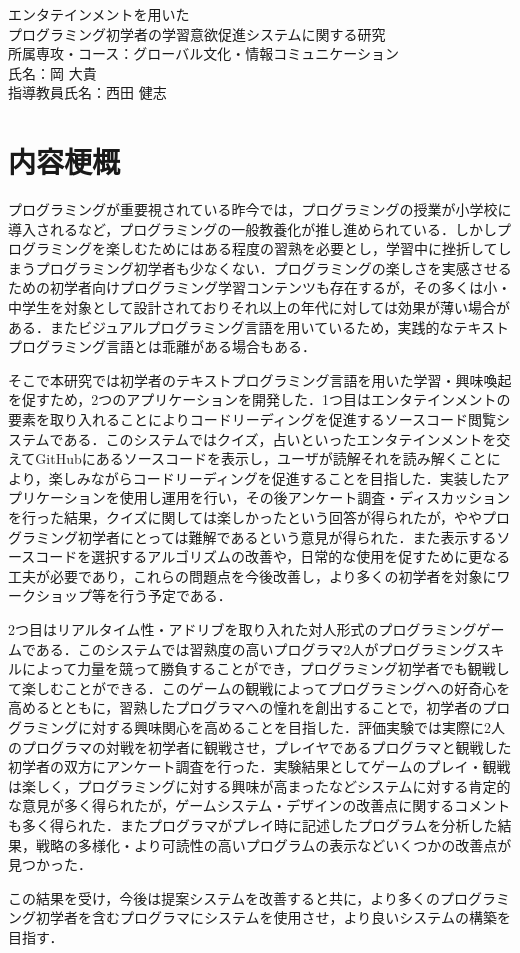 \begin{center}
  {\Large エンタテインメントを用いた\\プログラミング初学者の学習意欲促進システムに関する研究}\\
  \vspace{20truept}
  所属専攻・コース：グローバル文化・情報コミュニケーション\\
  氏名：岡 大貴\\
  指導教員氏名：西田 健志
\end{center}

\section*{内容梗概}

プログラミングが重要視されている昨今では，プログラミングの授業が小学校に導入されるなど，プログラミングの一般教養化が推し進められている．しかしプログラミングを楽しむためにはある程度の習熟を必要とし，学習中に挫折してしまうプログラミング初学者も少なくない．プログラミングの楽しさを実感させるための初学者向けプログラミング学習コンテンツも存在するが，その多くは小・中学生を対象として設計されておりそれ以上の年代に対しては効果が薄い場合がある．またビジュアルプログラミング言語を用いているため，実践的なテキストプログラミング言語とは乖離がある場合もある．


そこで本研究では初学者のテキストプログラミング言語を用いた学習・興味喚起を促すため，2つのアプリケーションを開発した．1つ目はエンタテインメントの要素を取り入れることによりコードリーディングを促進するソースコード閲覧システムである．このシステムではクイズ，占いといったエンタテインメントを交えてGitHubにあるソースコードを表示し，ユーザが読解それを読み解くことにより，楽しみながらコードリーディングを促進することを目指した．実装したアプリケーションを使用し運用を行い，その後アンケート調査・ディスカッションを行った結果，クイズに関しては楽しかったという回答が得られたが，ややプログラミング初学者にとっては難解であるという意見が得られた．また表示するソースコードを選択するアルゴリズムの改善や，日常的な使用を促すために更なる工夫が必要であり，これらの問題点を今後改善し，より多くの初学者を対象にワークショップ等を行う予定である．


2つ目はリアルタイム性・アドリブを取り入れた対人形式のプログラミングゲームである．このシステムでは習熟度の高いプログラマ2人がプログラミングスキルによって力量を競って勝負することができ，プログラミング初学者でも観戦して楽しむことができる．このゲームの観戦によってプログラミングへの好奇心を高めるとともに，習熟したプログラマへの憧れを創出することで，初学者のプログラミングに対する興味関心を高めることを目指した．評価実験では実際に2人のプログラマの対戦を初学者に観戦させ，プレイヤであるプログラマと観戦した初学者の双方にアンケート調査を行った．実験結果としてゲームのプレイ・観戦は楽しく，プログラミングに対する興味が高まったなどシステムに対する肯定的な意見が多く得られたが，ゲームシステム・デザインの改善点に関するコメントも多く得られた．またプログラマがプレイ時に記述したプログラムを分析した結果，戦略の多様化・より可読性の高いプログラムの表示などいくつかの改善点が見つかった．

この結果を受け，今後は提案システムを改善すると共に，より多くのプログラミング初学者を含むプログラマにシステムを使用させ，より良いシステムの構築を目指す．